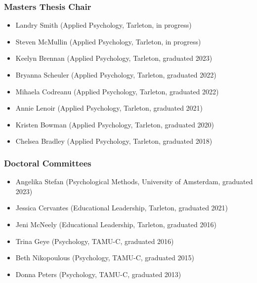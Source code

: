 \documentclass[article,10pt]{article}
\begin{document}
\subsubsection*{Masters Thesis Chair}
\label{sec:orgb2ba467}
\begin{itemize}
\item Landry Smith (Applied Psychology, Tarleton, in progress)
\item Steven McMullin (Applied Psychology, Tarleton, in progress)
\item Keelyn Brennan (Applied Psychology, Tarleton, graduated 2023)
\item Bryanna Scheuler (Applied Psychology, Tarleton, graduated 2022)
\item Mihaela Codreanu (Applied Psychology, Tarleton, graduated 2022)
\item Annie Lenoir (Applied Psychology, Tarleton, graduated 2021)
\item Kristen Bowman (Applied Psychology, Tarleton, graduated 2020)
\item Chelsea Bradley (Applied Psychology, Tarleton, graduated 2018)
\end{itemize}

\subsubsection*{Doctoral Committees}
\label{sec:orgfd6581e}
\begin{itemize}
\item Angelika Stefan (Psychological Methods, University of Amsterdam, graduated 2023)
\item Jessica Cervantes (Educational Leadership, Tarleton, graduated 2021)
\item Jeni McNeely (Educational Leadership, Tarleton, graduated 2016)
\item Trina Geye (Psychology, TAMU-C, graduated 2016)
\item Beth Nikopoulous (Psychology, TAMU-C, graduated 2015)
\item Donna Peters (Psychology, TAMU-C, graduated 2013)
\end{itemize}
\end{document}

